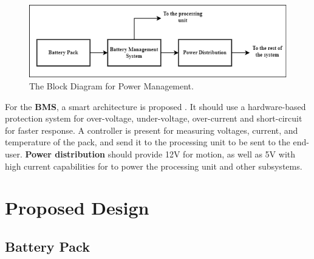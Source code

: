 \newpage

\begin{figure}[h!]
    \centering
    \includegraphics[scale=0.5]{./Figures/HW/powerDiagram-drawio.png}
    \caption{The Block Diagram for Power Management.}
    \label{fig:hw-power-blk1}
\end{figure}



For the \textbf{BMS}, a smart architecture is proposed . It should use a hardware-based protection  system for over-voltage, under-voltage, over-current and short-circuit for faster response. 
\newline A controller is present for measuring voltages, current, and temperature of the pack, and send it to the processing unit to be sent to the end-user. \cite{bms_david}\textbf{Power distribution} should provide 12V for motion, as well as 5V with high current capabilities for to power the processing unit and other subsystems.


\section{Proposed Design }
\subsection{Battery Pack}\label{subsection:battery}

